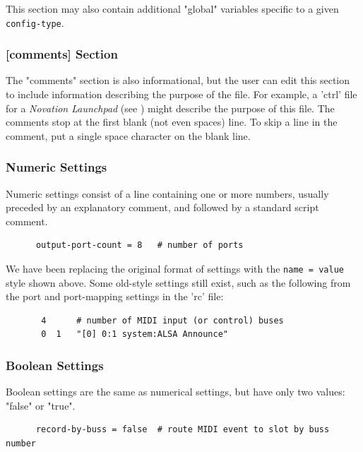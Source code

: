    This section may also contain additional "global"
   variables specific to a given \texttt{config-type}.

\subsubsection{[comments] Section}
\label{subsec:configuration_common_comments_section}

   The "comments" section is also informational, but the user can edit this
   section to include information describing the purpose of the file.  For
   example, a 'ctrl' file for a \textsl{Novation Launchpad}
   (see )
   might describe the
   purpose of this file.  The comments stop at the first blank (not even spaces)
   line.  To skip a line in the comment, put a single space character on the
   blank line.

\subsubsection{Numeric Settings}
\label{subsec:configuration_common_numeric_settings}

   Numeric settings consist of a line containing one or more numbers, usually
   preceded by an explanatory comment, and followed by a standard script
   comment.

   \begin{verbatim}
      output-port-count = 8   # number of ports
   \end{verbatim}

   We have been replacing the original format of settings with the
   \texttt{name = value} style shown above.
   Some old-style settings still exist, such as the following from
   the port and port-mapping settings in the 'rc' file:

   \begin{verbatim}
       4      # number of MIDI input (or control) buses
       0  1   "[0] 0:1 system:ALSA Announce"
   \end{verbatim}

\subsubsection{Boolean Settings}
\label{subsec:configuration_common_boolean_settings}

   Boolean settings are the same as numerical settings, but have only
   two values: "false" or "true".

   \begin{verbatim}
      record-by-buss = false  # route MIDI event to slot by buss number
   \end{verbatim}

